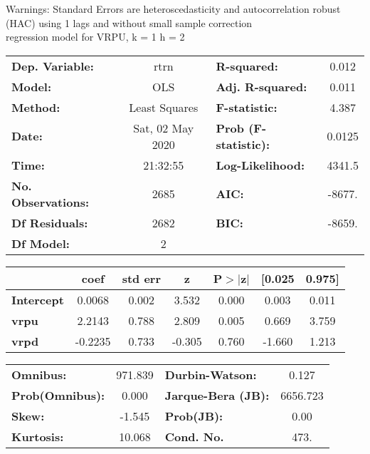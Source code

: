 Warnings: \newline
 [1] Standard Errors are heteroscedasticity and autocorrelation robust (HAC) using 1 lags and without small sample correction\\ 

regression model for VRPU, k = 1 h = 2\begin{center}
\begin{tabular}{lclc}
\toprule
\textbf{Dep. Variable:}    &       rtrn       & \textbf{  R-squared:         } &     0.012   \\
\textbf{Model:}            &       OLS        & \textbf{  Adj. R-squared:    } &     0.011   \\
\textbf{Method:}           &  Least Squares   & \textbf{  F-statistic:       } &     4.387   \\
\textbf{Date:}             & Sat, 02 May 2020 & \textbf{  Prob (F-statistic):} &   0.0125    \\
\textbf{Time:}             &     21:32:55     & \textbf{  Log-Likelihood:    } &    4341.5   \\
\textbf{No. Observations:} &        2685      & \textbf{  AIC:               } &    -8677.   \\
\textbf{Df Residuals:}     &        2682      & \textbf{  BIC:               } &    -8659.   \\
\textbf{Df Model:}         &           2      & \textbf{                     } &             \\
\bottomrule
\end{tabular}
\begin{tabular}{lcccccc}
                   & \textbf{coef} & \textbf{std err} & \textbf{z} & \textbf{P$> |$z$|$} & \textbf{[0.025} & \textbf{0.975]}  \\
\midrule
\textbf{Intercept} &       0.0068  &        0.002     &     3.532  &         0.000        &        0.003    &        0.011     \\
\textbf{vrpu}      &       2.2143  &        0.788     &     2.809  &         0.005        &        0.669    &        3.759     \\
\textbf{vrpd}      &      -0.2235  &        0.733     &    -0.305  &         0.760        &       -1.660    &        1.213     \\
\bottomrule
\end{tabular}
\begin{tabular}{lclc}
\textbf{Omnibus:}       & 971.839 & \textbf{  Durbin-Watson:     } &    0.127  \\
\textbf{Prob(Omnibus):} &   0.000 & \textbf{  Jarque-Bera (JB):  } & 6656.723  \\
\textbf{Skew:}          &  -1.545 & \textbf{  Prob(JB):          } &     0.00  \\
\textbf{Kurtosis:}      &  10.068 & \textbf{  Cond. No.          } &     473.  \\
\bottomrule
\end{tabular}
\end{center}

